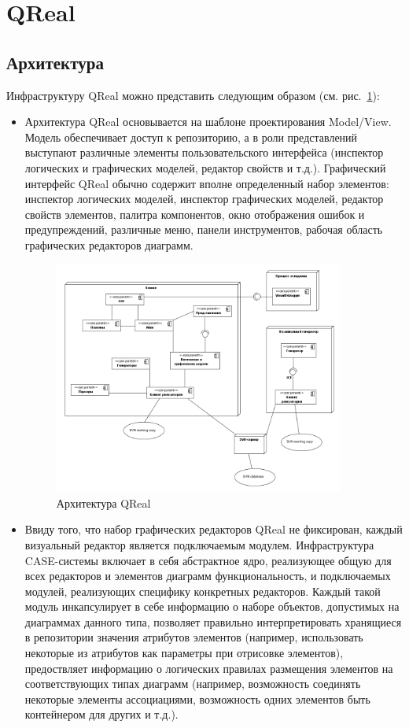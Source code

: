 \documentclass[a4paper]{article}
\begin{document}
\section{QReal}

\subsection{Архитектура}
Инфраструктуру QReal можно представить следующим образом (см. рис.~\ref{qRealArchitecture}):

\begin{itemize}
  \item Архитектура QReal основывается на шаблоне проектирования Model/View. Модель обеспечивает доступ к репозиторию, а в роли представлений выступают различные элементы пользовательского интерфейса (инспектор логических и графических моделей, редактор свойств и т.д.). Графический интерфейс QReal обычно содержит вполне определенный набор элементов: инспектор логических моделей, инспектор графических моделей, редактор свойств элементов, палитра компонентов, окно отображения ошибок и предупреждений, различные меню, панели инструментов, рабочая область графических редакторов диаграмм.
\begin{figure} [ht]
  \begin{center}
    \includegraphics[width=0.9\textwidth]{01-architecture.png}
    \caption{Архитектура QReal}
    \label{qRealArchitecture}
  \end{center}
\end{figure}
  \item Ввиду того, что набор графических редакторов QReal не фиксирован, каждый визуальный редактор является подключаемым модулем. Инфраструктура CASE-системы включает в себя абстрактное ядро, реализующее общую для всех редакторов и элементов диаграмм функциональность, и подключаемых модулей, реализующих специфику конкретных редакторов. Каждый такой модуль инкапсулирует в себе информацию о наборе объектов, допустимых на диаграммах данного типа, позволяет правильно интерпретировать хранящиеся в репозитории значения атрибутов элементов (например, использовать некоторые из атрибутов как параметры при отрисовке элементов), предоствляет информацию о логических правилах размещения элементов на соответствующих типах диаграмм (например, возможность соединять некоторые элементы ассоциациями, возможность одних элементов быть контейнером для других и т.д.).

\end{itemize}
\end{document}
